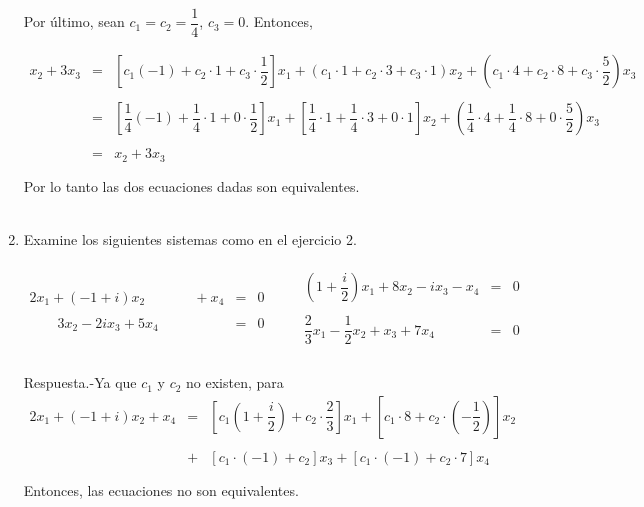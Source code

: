\begin{enumerate}[\bfseries 1.]
	Por último, sean $c_1=c_2=\dfrac{1}{4}$, $c_3=0$. Entonces,

	$$\begin{array}{rcl}
	    x_2+3x_3 &=& \left[c_1(-1)+c_2\cdot 1 + c_3\cdot \dfrac{1}{2}\right]x_1+(c_1\cdot 1 + c_2\cdot 3 + c_3\cdot 1)x_2+\left(c_1 \cdot 4+c_2\cdot 8 + c_3\cdot \dfrac{5}{2}\right)x_3\\\\
	    		    &=& \left[\dfrac{1}{4}(-1)+\dfrac{1}{4}\cdot 1 + 0\cdot \dfrac{1}{2}\right]x_1+\left[\dfrac{1}{4}\cdot 1 + \dfrac{1}{4}\cdot 3 + 0\cdot 1\right]x_2+\left(\dfrac{1}{4} \cdot 4+\dfrac{1}{4}\cdot 8 + 0\cdot \dfrac{5}{2}\right)x_3\\\\
			    &=&x_2+3x_3\\\\
	\end{array}$$ 
	Por lo tanto las dos ecuaciones dadas son equivalentes.\\\\


    \item Examine los siguientes sistemas como en el ejercicio 2.\\\\
    $$\begin{array}{rcl}
	2x_1+(-1+i)x_2 \qquad \quad\;\, + x_4 &=& 0\\\\
	\qquad 3x_2-2ix_3+5x_4 &=& 0\\
    \end{array}\qquad 
    \begin{array}{rcl}
	\left(1+\dfrac{i}{2}\right)x_1+8x_2-ix_3-x_4&=&0\\\\
	\dfrac{2}{3}x_1-\dfrac{1}{2}x_2+x_3+7x_4&=&0\\\\
    \end{array}$$ 
    \vspace{0.4cm}

	Respuesta.-\;Ya que  $c_1$ y $c_2$ no existen, para
	$$\begin{array}{rcl}
	    2x_1+(-1+i)x_2 + x_4 &=& \left[c_1\left(1+\dfrac{i}{2}\right)+c_2\cdot\dfrac{2}{3}\right]x_1 +  \left[c_1\cdot 8+c_2\cdot\left(-\dfrac{1}{2}\right)\right]x_2 \\\\
				 &+& \left[c_1\cdot (-1)+c_2\right]x_3 + \left[c_1\cdot (-1)+c_2\cdot 7\right]x_4\\\\
	\end{array}$$
	Entonces, las ecuaciones no son equivalentes.\\\\


\end{enumerate}

